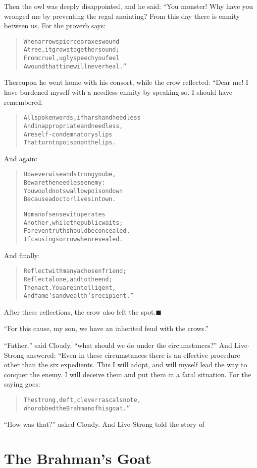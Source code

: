 \documentclass[article, twoside, 14pt]{memoir}
\newcommand{\qed}{\hfill \ensuremath{\blacksquare}}
\renewenvironment{verbatim}{%
\begin{quote}%
\vskip -10pt%
\begin{alltt}\normalfont\large}{\end{alltt}%
\end{quote}%
\vskip -10pt
} %
\begin{document}
Then the owl was deeply disappointed, and he said: “You monster!
Why have you wronged me by preventing the regal anointing? From
this day there is enmity between us. For the proverb says:

\begin{verbatim}
When arrows pierce or axes wound
A tree, it grows together sound;
From cruel, ugly speech you feel
A wound that time will never heal.”
\end{verbatim}
Thereupon he went home with his consort, while the crow
reflected: “Dear me! I have burdened myself with a needless enmity
by speaking so. I should have remembered:

\begin{verbatim}
All spoken words, if harsh and heedless
And inappropriate and needless,
Are self-condemnatory slips
That turn to poison on the lips.
\end{verbatim}
And again:

\begin{verbatim}
However wise and strong you be,
Beware the needless enemy:
You would not swallow poison down
Because a doctor lives in town.

No man of sense vituperates
Another, while the public waits;
For even truth should be concealed,
If causing sorrow when revealed.
\end{verbatim}
And finally:

\begin{verbatim}
Reflect with many a chosen friend;
Reflect alone, and to the end;
Then act. You are intelligent,
And fame's and wealth's recipient.”
\end{verbatim}
After these reflections, the crow also left the
spot.\hyperref[s48]{\qed}

``For this cause, my son, we have an inherited feud with the crows.''

``Father,'' said Cloudy,
``what should we do under the circumstances?'' And Live-Strong
answered: “Even in these circumstances there is an effective
procedure other than the six expedients. This I will adopt, and
will myself lead the way to conquer the enemy. I will deceive them
and put them in a fatal situation. For the saying goes:

\begin{verbatim}
The strong, deft, clever rascals note,
Who robbed the Brahman of his goat.”
\end{verbatim}
``How was that?'' asked Cloudy. And Live-Strong told the story of

\chapter{The Brahman's Goat}
\end{document}
